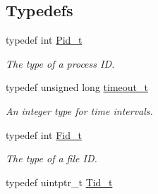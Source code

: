 \subsection*{Typedefs}
\begin{DoxyCompactItemize}
\item 
typedef int \hyperlink{group__syscalls_gafac07f3170763932fac97b6eab2c3984}{Pid\+\_\+t}\hypertarget{group__syscalls_gafac07f3170763932fac97b6eab2c3984}{}\label{group__syscalls_gafac07f3170763932fac97b6eab2c3984}

\begin{DoxyCompactList}\small\item\em The type of a process ID. \end{DoxyCompactList}\item 
typedef unsigned long \hyperlink{group__syscalls_gaf412159e5cef839836a5e7b19ee75d1c}{timeout\+\_\+t}
\begin{DoxyCompactList}\small\item\em An integer type for time intervals. \end{DoxyCompactList}\item 
typedef int \hyperlink{group__syscalls_ga5097222c5f0da97d92d4712359abc38f}{Fid\+\_\+t}\hypertarget{group__syscalls_ga5097222c5f0da97d92d4712359abc38f}{}\label{group__syscalls_ga5097222c5f0da97d92d4712359abc38f}

\begin{DoxyCompactList}\small\item\em The type of a file ID. \end{DoxyCompactList}\item 
typedef uintptr\+\_\+t \hyperlink{group__syscalls_gaf67ad1c55e6b2a79bf8a99106380ce01}{Tid\+\_\+t}\hypertarget{group__syscalls_gaf67ad1c55e6b2a79bf8a99106380ce01}{}\label{group__syscalls_gaf67ad1c55e6b2a79bf8a99106380ce01}


\end{DoxyCompactItemize}
